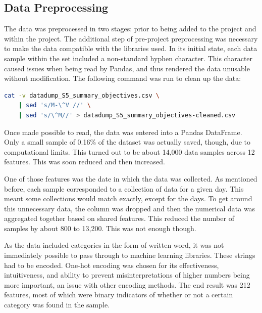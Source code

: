 \documentclass[12pt]{article}
\begin{document}
\newpage

\subsection{Data Preprocessing}
The data was preprocessed in two stages: prior to being added to the project and within the project.
The additional step of pre-project preprocessing was necessary to make the data compatible with the libraries used.
In its initial state, each data sample within the set included a non-standard hyphen character.
This character caused issues when being read by Pandas, and thus rendered the data unusable without modification.
The following command was run to clean up the data:
\begin{lstlisting}[language=Bash]
	cat -v datadump_S5_summary_objectives.csv \
	| sed 's/M-\^V //' \
	| sed 's/\^M//' > datadump_S5_summary_objectives-cleaned.csv
\end{lstlisting}

Once made possible to read, the data was entered into a Pandas DataFrame.
Only a small sample of 0.16\% of the dataset was actually saved, though, due to computational limits.
This turned out to be about 14,000 data samples across 12 features.
This was soon reduced and then increased.

One of those features was the date in which the data was collected.
As mentioned before, each sample corresponded to a collection of data for a given day.
This meant some collections would match exactly, except for the days.
To get around this unnecessary data, the column was dropped and then the numerical data was aggregated together based on shared features.
This reduced the number of samples by about 800 to 13,200.
This was not enough though.

As the data included categories in the form of written word, it was not immediately possible to pass through to machine learning libraries.
These strings had to be encoded.
One-hot encoding was chosen for its effectiveness, intuitiveness, and ability to prevent misinterpretations of higher numbers being more important, an issue with other encoding methods.
The end result was 212 features, most of which were binary indicators of whether or not a certain category was found in the sample.

\newpage


\end{document}
